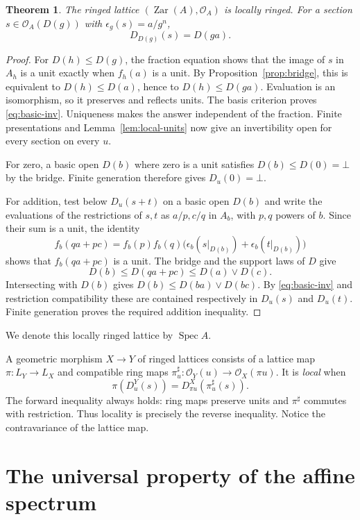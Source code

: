 \documentclass[11pt]{amsart}
\newtheorem{theorem}{Theorem}[section]
\theoremstyle{definition}
\theoremstyle{remark}
\newcommand{\Zar}{\operatorname{Zar}}
\newcommand{\Spec}{\operatorname{Spec}}
\newcommand{\OO}{\mathcal O}
\newcommand{\restr}[2]{#1|_{#2}}
\begin{document}
\begin{theorem}\label{thm:affine}
The ringed lattice $(\Zar(A),\OO_A)$ is locally ringed. For a section
$s\in\OO_A(D(g))$ with $\epsilon_g(s)=a/g^n$,
\begin{equation}\label{eq:basic-inv}
 D_{D(g)}(s)=D(ga).
\end{equation}
\end{theorem}
\begin{proof}
For $D(h)\leq D(g)$, the fraction equation shows that the image of $s$
in $A_h$ is a unit exactly when $f_h(a)$ is a unit. By
Proposition~\ref{prop:bridge}, this is equivalent to
$D(h)\leq D(a)$, hence to $D(h)\leq D(ga)$.
Evaluation is an isomorphism, so it preserves and reflects units.
The basis criterion proves \eqref{eq:basic-inv}. Uniqueness makes the
answer independent of the fraction. Finite presentations and
Lemma~\ref{lem:local-units} now give an invertibility open for every
section on every $u$.

For zero, a basic open $D(b)$ where zero is a unit satisfies
$D(b)\leq D(0)=\bot$ by the bridge. Finite generation therefore gives
$D_u(0)=\bot$.

For addition, test below $D_u(s+t)$ on a basic open $D(b)$ and write the
evaluations of the restrictions of $s,t$ as $a/p,c/q$ in $A_b$, with
$p,q$ powers of $b$. Since their sum is a unit, the identity
\[
 f_b(qa+pc)=f_b(p)f_b(q)\bigl(\epsilon_b(\restr{s}{D(b)})+
                              \epsilon_b(\restr{t}{D(b)})\bigr)
\]
shows that $f_b(qa+pc)$ is a unit. The bridge and the support laws of
$D$ give
\[
 D(b)\leq D(qa+pc)\leq D(a)\vee D(c).
\]
Intersecting with $D(b)$ gives
$D(b)\leq D(ba)\vee D(bc)$. By \eqref{eq:basic-inv} and restriction
compatibility these are contained respectively in $D_u(s)$ and
$D_u(t)$. Finite generation proves the required addition inequality.
\end{proof}

We denote this locally ringed lattice by $\Spec A$.

A geometric morphism $X\to Y$ of ringed lattices consists of a lattice
map $\pi:L_Y\to L_X$ and compatible ring maps
$\pi^\sharp_u:\OO_Y(u)\to\OO_X(\pi u)$. It is \emph{local} when
\[
 \pi(D^Y_u(s))=D^X_{\pi u}(\pi^\sharp_u(s)).
\]
The forward inequality always holds: ring maps preserve units and
$\pi^\sharp$ commutes with restriction. Thus locality is precisely the
reverse inequality. Notice the contravariance of the lattice map.

\section{The universal property of the affine spectrum}
\end{document}
